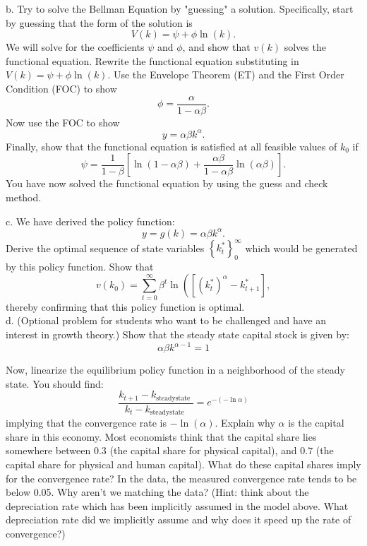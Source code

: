 \documentclass[11pt]{extarticle}
\theoremstyle{plain}
\theoremstyle{definition}
\begin{document}
b. Try to solve the Bellman Equation by "guessing" a solution. Specifically, start by guessing that the form of the solution is
$$
V(k)=\psi+\phi \ln (k) .
$$
We will solve for the coefficients $\psi$ and $\phi$, and show that $v(k)$ solves the functional equation. Rewrite the functional equation substituting in $V(k)=\psi+\phi \ln (k)$. Use the Envelope Theorem (ET) and the First Order Condition (FOC) to show
$$
\phi=\frac{\alpha}{1-\alpha \beta} .
$$
Now use the FOC to show
$$
y=\alpha \beta k^\alpha .
$$
Finally, show that the functional equation is satisfied at all feasible values of $k_0$ if
$$
\psi=\frac{1}{1-\beta}\left[\ln (1-\alpha \beta)+\frac{\alpha \beta}{1-\alpha \beta} \ln (\alpha \beta)\right] .
$$
You have now solved the functional equation by using the guess and check method.


c. We have derived the policy function:
$$
y=g(k)=\alpha \beta k^\alpha .
$$
Derive the optimal sequence of state variables $\left\{k_t^*\right\}_0^{\infty}$ which would be generated by this policy function. Show that
$$
v\left(k_0\right)=\sum_{t=0}^{\infty} \beta^t \ln \left(\left[\left(k_t^*\right)^\alpha-k_{t+1}^*\right],\right.
$$
thereby confirming that this policy function is optimal. \\

d. (Optional problem for students who want to be challenged and have an interest in growth theory.) Show that the steady state capital stock is given by:
$$
\alpha \beta k^{\alpha-1}=1
$$


Now, linearize the equilibrium policy function in a neighborhood of the steady state. You should find:
$$
\frac{k_{t+1}-k_{\text {steadystate }}}{k_t-k_{\text {steadystate }}}=e^{-(-\ln \alpha)}
$$
implying that the convergence rate is $-\ln (\alpha)$. Explain why $\alpha$ is the capital share in this economy. Most economists think that the capital share lies somewhere between $0.3$ (the capital share for physical capital), and $0.7$ (the capital share for physical and human capital). What do these capital shares imply for the convergence rate? In the data, the measured convergence rate tends to be below 0.05. Why aren't we matching the data? (Hint: think about the depreciation rate which has been implicitly assumed in the model above. What depreciation rate did we implicitly assume and why does it speed up the rate of convergence?)


\vspace{10mm}
\end{document}
